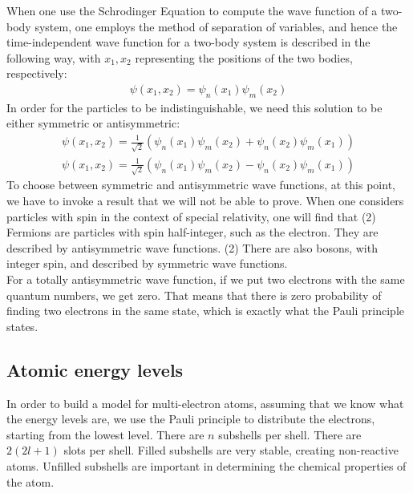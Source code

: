 \documentclass[11pt]{article}
\theoremstyle{break}
\theoremstyle{break}
\begin{document}
When one use the Schrodinger Equation to compute the wave function of a two-body system, one employs the method of separation of variables, and hence the time-independent wave function for a two-body system is described in the following way, with $x_1,x_2$ representing the positions of the two bodies, respectively:
\begin{align*}
\psi(x_1,x_2) = \psi_n(x_1) \psi_m(x_2)
\end{align*}
In order for the particles to be indistinguishable, we need this solution to be either symmetric or antisymmetric:
\begin{align}
\psi(x_1,x_2) = \frac{1}{\sqrt{2}}\left( \psi_n(x_1) \psi_m(x_2) + \psi_n(x_2) \psi_m(x_1) \right) \tag{symmetric}\\
\psi(x_1,x_2) = \frac{1}{\sqrt{2}}\left( \psi_n(x_1) \psi_m(x_2) - \psi_n(x_2) \psi_m(x_1) \right) \tag{antisymmetric}
\end{align}
To choose between symmetric and antisymmetric wave functions, at this point, we have to invoke a result that we will not be able to prove. When one considers particles with spin in the context of special relativity, one will find that (2) Fermions are particles with spin half-integer, such as the electron. They are described by antisymmetric wave functions. (2) There are also bosons, with integer spin, and described by symmetric wave functions.\\ 

For a totally antisymmetric wave function, if we put two electrons with the same quantum numbers, we get zero. That means that there is zero probability of finding two electrons in the same state, which is exactly what the Pauli principle states.\\

\subsection{Atomic energy levels}
In order to build a model for multi-electron atoms, assuming that we know what the energy levels are, we use the Pauli principle to distribute the electrons, starting from the lowest level. There are $n$ subshells per shell. There are $2(2l+1)$ slots per shell. Filled subshells are very stable, creating non-reactive atoms. Unfilled subshells are important in determining the chemical properties of the atom.\\
\end{document}
